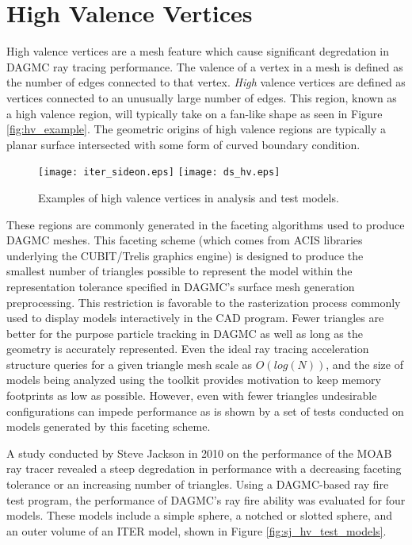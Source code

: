 

\chapter{High Valence Vertices}\label{ch:high_valence}

High valence vertices are a mesh feature which cause significant degredation in
DAGMC ray tracing performance. The valence of a vertex in a mesh is defined as
the number of edges connected to that vertex. \textit{High} valence vertices are
defined as vertices connected to an unusually large number of edges. This
region, known as a high valence region, will typically take on a fan-like shape
as seen in Figure \ref{fig:hv_example}.  The geometric origins of high valence
regions are typically a planar surface intersected with some form of curved
boundary condition. 

\begin{figure}[H]
  \centering
  \texttt{[image: iter\_sideon.eps]}
  \texttt{[image: ds\_hv.eps]}
  \caption{Examples of high valence vertices in analysis and test models.}
  \label{fig:hv_examples}
\end{figure}

These regions are commonly generated in the faceting algorithms used to produce
DAGMC meshes. This faceting scheme (which comes from ACIS libraries underlying
the CUBIT/Trelis graphics engine) is designed to produce the smallest number of
triangles possible to represent the model within the representation tolerance
specified in DAGMC's surface mesh generation preprocessing. This restriction is
favorable to the rasterization process commonly used to display models
interactively in the CAD program. Fewer triangles are better for the purpose
particle tracking in DAGMC as well as long as the geometry is accurately
represented. Even the ideal ray tracing acceleration structure queries for a
given triangle mesh scale as $O(log(N))$, and the size of models being analyzed
using the toolkit provides motivation to keep memory footprints as low as
possible. However, even with fewer triangles undesirable configurations can
impede performance as is shown by a set of tests conducted on models generated
by this faceting scheme.

A study conducted by Steve Jackson in 2010 on the performance of the MOAB ray
tracer revealed a steep degredation in performance with a decreasing faceting
tolerance or an increasing number of triangles. Using a DAGMC-based ray fire
test program, the performance of DAGMC's ray fire ability was evaluated for four
models. These models include a simple sphere, a notched or slotted sphere, and
an outer volume of an ITER model, shown in Figure \ref{fig:sj_hv_test_models}.

